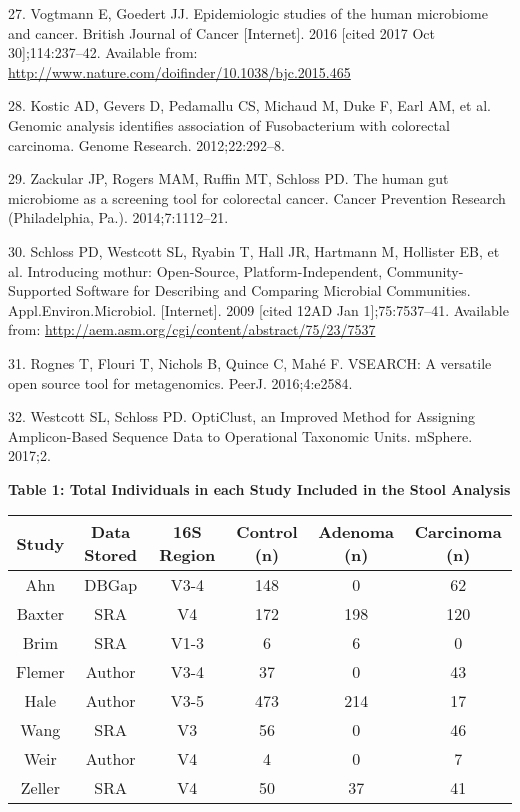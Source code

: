 \documentclass[12pt,]{article}
\begin{document}
\hypertarget{ref-vogtmann_epidemiologic_2016}{}
27. Vogtmann E, Goedert JJ. Epidemiologic studies of the human
microbiome and cancer. British Journal of Cancer {[}Internet{]}. 2016
{[}cited 2017 Oct 30{]};114:237--42. Available from:
\url{http://www.nature.com/doifinder/10.1038/bjc.2015.465}

\hypertarget{ref-kostic_genomic_2012}{}
28. Kostic AD, Gevers D, Pedamallu CS, Michaud M, Duke F, Earl AM, et
al. Genomic analysis identifies association of Fusobacterium with
colorectal carcinoma. Genome Research. 2012;22:292--8.

\hypertarget{ref-zackular_human_2014}{}
29. Zackular JP, Rogers MAM, Ruffin MT, Schloss PD. The human gut
microbiome as a screening tool for colorectal cancer. Cancer Prevention
Research (Philadelphia, Pa.). 2014;7:1112--21.

\hypertarget{ref-schloss_introducing_2009}{}
30. Schloss PD, Westcott SL, Ryabin T, Hall JR, Hartmann M, Hollister
EB, et al. Introducing mothur: Open-Source, Platform-Independent,
Community-Supported Software for Describing and Comparing Microbial
Communities. Appl.Environ.Microbiol. {[}Internet{]}. 2009 {[}cited 12AD
Jan 1{]};75:7537--41. Available from:
\url{http://aem.asm.org/cgi/content/abstract/75/23/7537}

\hypertarget{ref-rognes_vsearch_2016}{}
31. Rognes T, Flouri T, Nichols B, Quince C, Mahé F. VSEARCH: A
versatile open source tool for metagenomics. PeerJ. 2016;4:e2584.

\hypertarget{ref-westcott_opticlust_2017}{}
32. Westcott SL, Schloss PD. OptiClust, an Improved Method for Assigning
Amplicon-Based Sequence Data to Operational Taxonomic Units. mSphere.
2017;2.

\newpage

\textbf{Table 1: Total Individuals in each Study Included in the Stool
Analysis}

\footnotesize

\begin{longtable}[]{@{}cccccc@{}}
\toprule
Study & Data Stored & 16S Region & Control (n) & Adenoma (n) & Carcinoma
(n)\tabularnewline
\midrule
\endhead
Ahn & DBGap & V3-4 & 148 & 0 & 62\tabularnewline
Baxter & SRA & V4 & 172 & 198 & 120\tabularnewline
Brim & SRA & V1-3 & 6 & 6 & 0\tabularnewline
Flemer & Author & V3-4 & 37 & 0 & 43\tabularnewline
Hale & Author & V3-5 & 473 & 214 & 17\tabularnewline
Wang & SRA & V3 & 56 & 0 & 46\tabularnewline
Weir & Author & V4 & 4 & 0 & 7\tabularnewline
Zeller & SRA & V4 & 50 & 37 & 41\tabularnewline
\bottomrule
\end{longtable}
\end{document}
